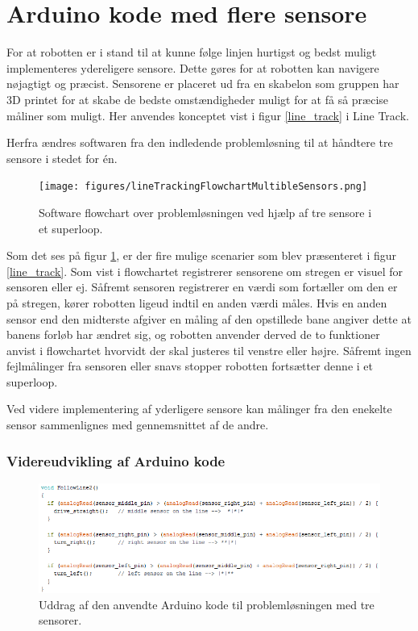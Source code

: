 \section{Arduino kode med flere sensore}
For at robotten er i stand til at kunne følge linjen hurtigst og bedst muligt implementeres ydereligere sensore. Dette gøres for at robotten kan navigere nøjagtigt og præcist. Sensorene er placeret ud fra en skabelon som gruppen har 3D printet for at skabe de bedste omstændigheder muligt for at få så præcise måliner som muligt.
\newline 
Her anvendes konceptet vist i figur \ref{line_track} i Line Track. 
\newline


Herfra ændres softwaren fra den indledende problemløsning til at håndtere tre sensore i stedet for én. 

\begin{figure}[h!]
  \centering
  \texttt{[image: figures/lineTrackingFlowchartMultibleSensors.png]}
  \caption{Software flowchart over problemløsningen ved hjælp af tre sensore i et superloop.}
  \label{flowchart_flere_sensorer}
\end{figure}
\newpage

Som det ses på figur \ref{flowchart_flere_sensorer}, er der fire mulige scenarier som blev præsenteret i figur \ref{line_track}.
Som vist i flowchartet registrerer sensorene om stregen er visuel for sensoren eller ej. Såfremt sensoren registrerer en værdi som fortæller om den er på stregen, kører robotten ligeud indtil en anden værdi måles. 
\newline 
Hvis en anden sensor end den midterste afgiver en måling af den opstillede bane angiver dette at banens forløb har ændret sig, og robotten anvender derved de to funktioner anvist i flowchartet hvorvidt der skal justeres til venstre eller højre. 
\newline
Såfremt ingen fejlmålinger fra sensoren eller snavs stopper robotten fortsætter denne i et superloop.
\newpage

Ved videre implementering af yderligere sensore kan målinger fra den enekelte sensor sammenlignes med gennemsnittet af de andre.

\subsubsection{Videreudvikling af Arduino kode}
\begin{figure}[h!]
  \centering
  \includegraphics[width=1.0\textwidth]{figures/followLine3.png}
  \caption{Uddrag af den anvendte Arduino kode til problemløsningen med tre sensorer.}
  \label{tre_sensore_followline}
\end{figure}
\newpage

